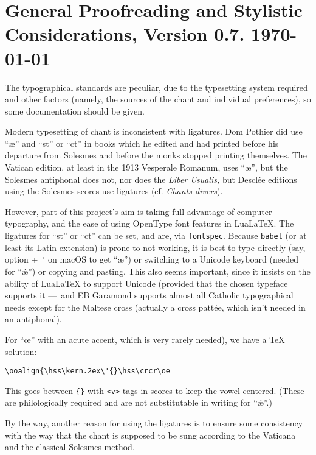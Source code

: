 \documentclass[11pt]{article}
\begin{document}
\section{General Proofreading and Stylistic Considerations, Version 0.7. \today}

The typographical standards are peculiar, due to the typesetting system required and other factors (namely, the sources of the chant and individual preferences), so some documentation should be given.

Modern typesetting of chant is inconsistent with ligatures. Dom Pothier did use ``æ'' and ``st'' or ``ct'' in books which he edited and had printed before his departure from Solesmes and before the monks stopped printing themselves. The Vatican edition, at least in the 1913 Vesperale Romanum, uses ``æ'', but the Solesmes antiphonal does not, nor does the \textit{Liber Usualis,} but Desclée editions using the Solesmes scores use ligatures (cf. \textit{Chants divers}).

However, part of this project's aim is taking full advantage of computer typography, and the ease of using OpenType font features in Lua\LaTeX{}. The ligatures for ``st'' or ``ct'' can be set, and are, via \verb|fontspec|. Because \verb|babel| (or at least its Latin extension) is prone to not working, it is best to type directly (say, option + \verb|'| on macOS to get ``æ'') or switching to a Unicode keyboard (needed for ``ǽ'') or copying and pasting. This also seems important, since it insists on the ability of Lua\LaTeX{} to support Unicode (provided that the chosen typeface supports it — and EB Garamond supports almost all Catholic typographical needs except for the Maltese cross (actually a cross pattée, which isn't needed in an antiphonal).

For ``œ'' with an acute accent, which is very rarely needed), we have a \TeX{} solution:

\begin{verbatim}\ooalign{\hss\kern.2ex\'{}\hss\crcr\oe\end{verbatim}

This goes between \verb|{}| with \verb|<v>| tags in scores to keep the vowel centered. (These are philologically required and are not substitutable in writing for ``ǽ''.)

By the way, another reason for using the ligatures is to ensure some consistency with the way that the chant is supposed to be sung according to the Vaticana and the classical Solesmes method.
\end{document}
